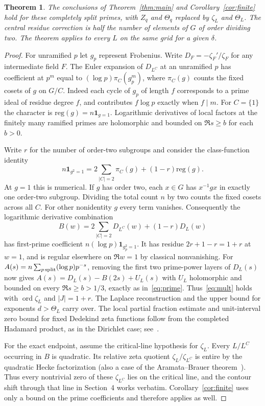 \documentclass[11pt]{article}
\newtheorem{theorem}{Theorem}[section]
\newcommand{\ord}{\operatorname{ord}}
\begin{document}
\begin{theorem}\label{thm:galois}
The conclusions of Theorem~\ref{thm:main} and Corollary~\ref{cor:finite} hold for these completely split primes, with $Z_q$ and $\Theta_q$ replaced by $\zeta_L$ and $\Theta_L$. The central residue correction is half the number of elements of $G$ of order dividing two. The theorem applies to every $L$ on the same grid for a given $\delta$.
\end{theorem}
\begin{proof}
For unramified $p$ let $g_p$ represent Frobenius. Write $D_F=-\zeta_F'/\zeta_F$ for any intermediate field $F$. The Euler expansion of $D_{L^C}$ at an unramified $p$ has coefficient at $p^m$ equal to $(\log p)\pi_C(g_p^m)$, where $\pi_C(g)$ counts the fixed cosets of $g$ on $G/C$. Indeed each cycle of $g_p$ of length $f$ corresponds to a prime ideal of residue degree $f$, and contributes $f\log p$ exactly when $f\mid m$. For $C=\{1\}$ the character is $\mathrm{reg}(g)=n\mathbf1_{g=1}$. Logarithmic derivatives of local factors at the finitely many ramified primes are holomorphic and bounded on $\Re s\ge b$ for each $b>0$.

Write $r$ for the number of order-two subgroups and consider the class-function identity
\[
 n\mathbf1_{g^2=1}=2\sum_{|C|=2}\pi_C(g)+(1-r)\mathrm{reg}(g).
\]
At $g=1$ this is numerical. If $g$ has order two, each $x\in G$ has $x^{-1}gx$ in exactly one order-two subgroup. Dividing the total count $n$ by two counts the fixed cosets across all $C$. For other nonidentity $g$ every term vanishes. Consequently the logarithmic derivative combination
\[
 B(w)=2\sum_{|C|=2}D_{L^C}(w)+(1-r)D_L(w)
\]
has first-prime coefficient $n(\log p)\mathbf1_{g_p^2=1}$. It has residue $2r+1-r=1+r$ at $w=1$, and is regular elsewhere on $\Re w=1$ by classical nonvanishing. For $A(s)=n\sum_{p\,{\rm split}}(\log p)p^{-s}$, removing the first two prime-power layers of $D_L(s)$ now gives $A(s)=D_L(s)-B(2s)+U_L(s)$ with $U_L$ holomorphic and bounded on every $\Re s\ge b>1/3$, exactly as in~\eqref{eq:prime}. Thus~\eqref{eq:mult} holds with $\ord\zeta_L$ and $|J|=1+r$. The Laplace reconstruction and the upper bound for exponents $d>\Theta_L$ carry over. The local partial fraction estimate and unit-interval zero bound for fixed Dedekind zeta functions follow from the completed Hadamard product, as in the Dirichlet case; see~\cite{lo}.

For the exact endpoint, assume the critical-line hypothesis for $\zeta_L$. Every $L/L^C$ occurring in $B$ is quadratic. Its relative zeta quotient $\zeta_L/\zeta_{L^C}$ is entire by the quadratic Hecke factorization (also a case of the Aramata--Brauer theorem~\cite{brauer}). Thus every nontrivial zero of these $\zeta_{L^C}$ lies on the critical line, and the contour shift through that line in Section~4 works verbatim. Corollary~\ref{cor:finite} uses only a bound on the prime coefficients and therefore applies as well.
\end{proof}
\end{document}
